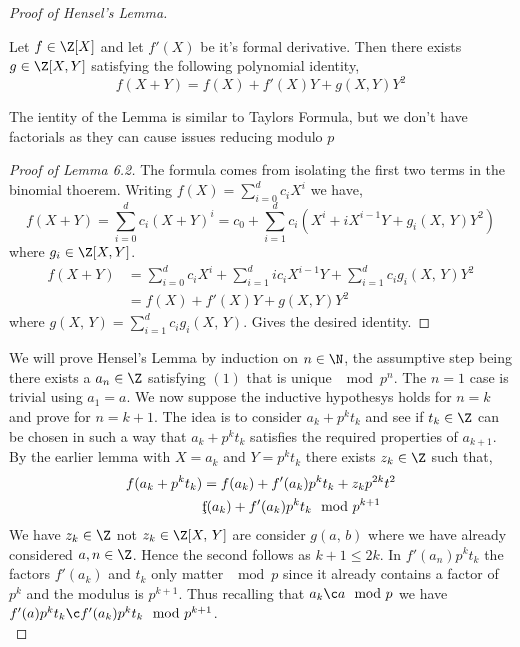 \begin{proof}[Proof of Hensel's Lemma]
  \begin{nlemma}
    Let $f \in \Z[X]$ and let $f'(X)$ be it's formal derivative. Then there exists $g \in \Z[X, Y]$ satisfying the following polynomial identity,
    $$ f(X + Y) = f(X) + f'(X)Y + g(X, Y)Y^2 $$
  \end{nlemma}
  \begin{remark}
     The ientity of the Lemma is similar to Taylors Formula, but we don't have factorials as they can cause issues reducing modulo $p$
  \end{remark}
  \begin{proof}[Proof of Lemma 6.2]
    The formula comes from isolating the first two terms in the binomial thoerem. Writing $f(X) = \sum_{i=0}^d c_iX^i$ we have,
    $$ f(X + Y) = \sum_{i=0}^d c_i(X + Y)^i = c_0 + \sum_{i=1}^d c_i(X^i + iX^{i-1}Y + g_i(X,\, Y)Y^2) $$
    where $g_i \in \Z[X, Y]$.
    \begin{align*}
      f(X + Y) &= \sum_{i=0}^d c_iX^i + \sum_{i=1}^d ic_iX^{i-1}Y + \sum_{i=1}^d c_ig_i(X,\, Y)Y^2 \\
      &= f(X) + f'(X)Y + g(X, Y)Y^2
    \end{align*}
    where $g(X,\, Y) = \sum_{i=1}^d c_ig_i(X,\,Y)$. Gives the desired identity.
  \end{proof}
   We will prove Hensel's Lemma by induction on $n \in \N$, the assumptive step being there exists a $a_n \in \Z$ satisfying $(1)$ that is unique $\mod p^n$. The $n = 1$ case is trivial using $a_1 = a$. We now suppose the inductive hypothesys holds for $n = k$ and prove for $n = k + 1$. The idea is to consider $a_k + p^kt_k$ and see if $t_k \in \Z$ can be chosen in such a way that $a_k + p^kt_k$ satisfies the required properties of $a_{k+1}$. By the earlier lemma with $X = a_k$ and $Y = p^kt_k$ there exists $z_k \in \Z$ such that,
   \begin{align*}
     f(a_k + p^kt_k) &= f(a_k) + f'(a_k)p^kt_k + z_kp^{2k}t^2 \\
     &\c f(a_k) + f'(a_k)p^kt_k \mod p^{k+1}
   \end{align*}
   We have $z_k \in \Z$ not $z_k \in \Z[X,\,Y]$ are consider $g(a,\,b)$ where we have already considered $a, n \in \Z$. Hence the second follows as $k+1 \le 2k$. In $f'(a_n)p^kt_k$ the factors $f'(a_k)$ and $t_k$ only matter $\mod p$ since it already contains a factor of $p^k$ and the modulus is $p^{k+1}$. Thus recalling that $a_k \c a \mod p$ we have $f'(a)p^kt_k \c f'(a_k)p^kt_k \mod p^{k+1}$.\\


\end{proof}
